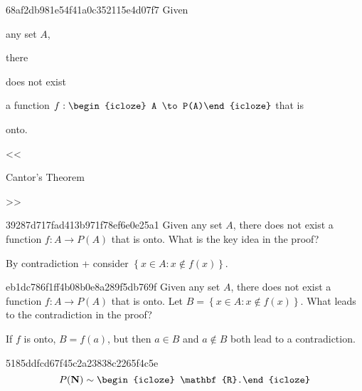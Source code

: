 \begin{note}{68af2db981e54f41a0c352115e4d07f7}
    Given \begin{icloze}{5}any set \({ A }\),\end{icloze} there \begin{icloze}{3}does not exist\end{icloze} a function \({ f : \begin{icloze}{2}A \to P(A)\end{icloze} }\) that is \begin{icloze}{1}onto.\end{icloze}

    \begin{center}
        \tiny
        <<\begin{icloze}{4}Cantor's Theorem\end{icloze}>>
    \end{center}
\end{note}

\begin{note}{39287d717fad413b971f78ef6e0e25a1}
    Given any set \({ A }\), there does not exist a function \({ f : A \to P(A) }\) that is onto.
    What is the key idea in the proof?

    \begin{cloze}{1}
        By contradiction + consider \({ \left\{ x \in A : x \not\in f(x) \right\} }\).
    \end{cloze}
\end{note}

\begin{note}{eb1dc786f1ff4b08b0e8a289f5db769f}
    Given any set \({ A }\), there does not exist a function \({ f : A \to P(A) }\) that is onto.
    Let \({ B = \left\{  x \in A : x \not\in f(x) \right\} }\).
    What leads to the contradiction in the proof?

    \begin{cloze}{1}
        If \({ f }\) is onto, \({ B = f(a) }\), but then \({ a \in B }\) and \({ a \not\in B }\) both lead to a contradiction.
    \end{cloze}
\end{note}

\begin{note}{5185ddfcd67f45c2a23838c2265f4c5e}
    \[
        P(\mathbf{N}) \sim \begin{icloze}{1}\mathbf{R}.\end{icloze}
    \]
\end{note}

